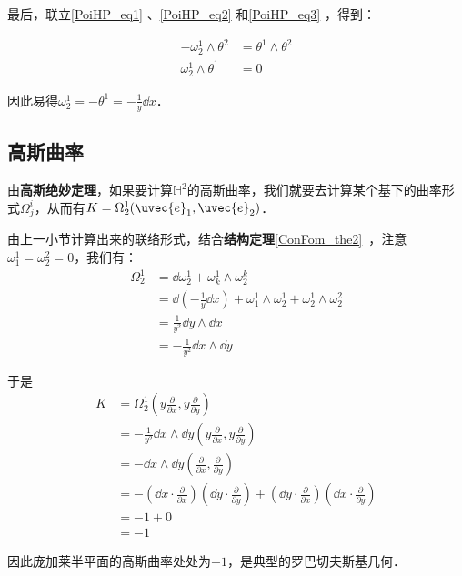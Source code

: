 最后，联立\autoref{PoiHP_eq1} 、\autoref{PoiHP_eq2} 和\autoref{PoiHP_eq3} ，得到：

\begin{equation}
\begin{aligned}
-\omega^1_2\wedge\theta^2&=\theta^1\wedge\theta^2\\
\omega^1_2\wedge\theta^1&=0
\end{aligned}
\end{equation}

因此易得$\omega^1_2=-\theta^1=-\frac{1}{y}\dd x$．



\subsection{高斯曲率}


由\textbf{高斯绝妙定理}，如果要计算$\mathbb{H}^2$的高斯曲率，我们就要去计算某个基下的曲率形式$\Omega^i_j$，从而有$K=\Omega^1_2(\uvec{e}_1, \uvec{e}_2)$．

由上一小节计算出来的联络形式，结合\textbf{结构定理}\autoref{ConFom_the2}~，注意$\omega^1_1=\omega^2_2=0$，我们有：
\begin{equation}
\begin{aligned}
\Omega^1_2&=\dd \omega^1_2+\omega^1_k\wedge\omega^k_2\\
&=\dd(-\frac{1}{y}\dd x)+\omega^1_1\wedge\omega^1_2+\omega^1_2\wedge\omega^2_2\\
&=\frac{1}{y^2}\dd y\wedge\dd x\\
&=-\frac{1}{y^2}\dd x\wedge \dd y
\end{aligned}
\end{equation}

于是
\begin{equation}
\begin{aligned}
K&=\Omega^1_2(y\frac{\partial}{\partial x}, y\frac{\partial}{\partial y})\\
&=-\frac{1}{y^2}\dd x\wedge \dd y(y\frac{\partial}{\partial x}, y\frac{\partial}{\partial y})\\
&=-\dd x\wedge \dd y(\frac{\partial}{\partial x}, \frac{\partial}{\partial y})\\
&=-(\dd x\cdot \frac{\partial}{\partial x})(\dd y\cdot \frac{\partial}{\partial y})+(\dd y\cdot \frac{\partial}{\partial x})(\dd x\cdot \frac{\partial}{\partial y})\\
&=-1+0\\
&=-1
\end{aligned}
\end{equation}

因此庞加莱半平面的高斯曲率处处为$-1$，是典型的罗巴切夫斯基几何．



